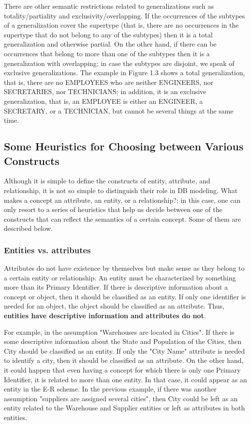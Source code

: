 \documentclass{article}
\begin{document}
There are other semantic restrictions related to generalizations such as totality/partiality and exclusivity/overlapping.  If the occurrences of the subtypes of a generalization cover the supertype (that is, there are no occurrences in the supertype that do not belong to any of the subtypes) then it is a total generalization and otherwise partial.  On the other hand, if there can be occurrences that belong to more than one of the subtypes then it is a generalization with overlapping; in case the subtypes are disjoint, we speak of exclusive generalizations.  The example in Figure 1.3 shows a total generalization, that is, there are no EMPLOYEES who are neither ENGINEERS, nor SECRETARIES, nor TECHNICIANS; in addition, it is an exclusive generalization, that is, an EMPLOYEE is either an ENGINEER, a SECRETARY, or a TECHNICIAN, but cannot be several things at the same time.

\subsection{
Some Heuristics for Choosing between Various Constructs
}

Although it is simple to define the constructs of entity, attribute, and relationship, it is not so simple to distinguish their role in DB modeling.  What makes a concept an attribute, an entity, or a relationship?; in this case, one can only resort to a series of heuristics that help us decide between one of the constructs that can reflect the semantics of a certain concept.  Some of them are described below.

\subsubsection{Entities vs. attributes}

Attributes do not have existence by themselves but make sense as they belong to a certain entity or relationship.  An entity must be characterized by something more than its Primary Identifier.  If there is descriptive information about a concept or object, then it should be classified as an entity.  If only one identifier is needed for an object, the object should be classified as an attribute.  Thus, \textbf{entities have descriptive information and attributes do not}.

For example, in the assumption "Warehouses are located in Cities".  If there is some descriptive information about the State and Population of the Cities, then City should be classified as an entity.  If only the "City Name" attribute is needed to identify a city, then it should be classified as an attribute.  On the other hand, it could happen that even having a concept for which there is only one Primary Identifier, it is related to more than one entity.  In that case, it could appear as an entity in the E-R scheme.  In the previous example, if there was another assumption "suppliers are assigned several cities", then City could be left as an entity related to the Warehouse and Supplier entities or left as attributes in both entities.
\end{document}
